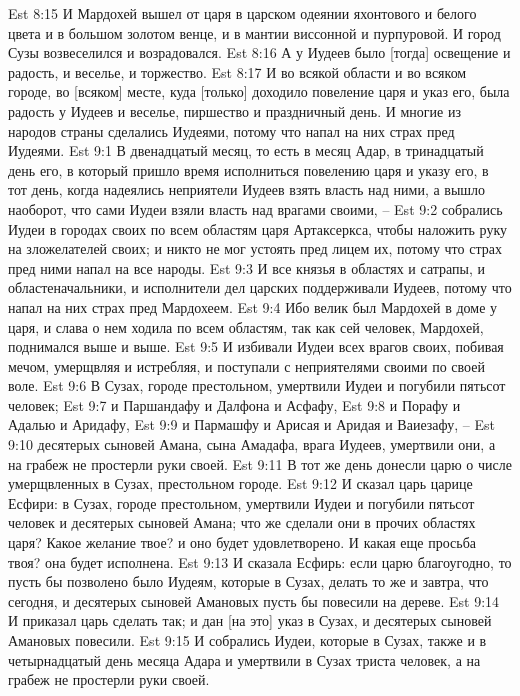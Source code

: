 Est 8:15  И Мардохей вышел от царя в царском одеянии яхонтового и белого цвета и в большом золотом венце, и в мантии виссонной и пурпуровой. И город Сузы возвеселился и возрадовался.
Est 8:16  А у Иудеев было [тогда] освещение и радость, и веселье, и торжество.
Est 8:17  И во всякой области и во всяком городе, во [всяком] месте, куда [только] доходило повеление царя и указ его, была радость у Иудеев и веселье, пиршество и праздничный день. И многие из народов страны сделались Иудеями, потому что напал на них страх пред Иудеями.
Est 9:1  В двенадцатый месяц, то есть в месяц Адар, в тринадцатый день его, в который пришло время исполниться повелению царя и указу его, в тот день, когда надеялись неприятели Иудеев взять власть над ними, а вышло наоборот, что сами Иудеи взяли власть над врагами своими, --
Est 9:2  собрались Иудеи в городах своих по всем областям царя Артаксеркса, чтобы наложить руку на зложелателей своих; и никто не мог устоять пред лицем их, потому что страх пред ними напал на все народы.
Est 9:3  И все князья в областях и сатрапы, и областеначальники, и исполнители дел царских поддерживали Иудеев, потому что напал на них страх пред Мардохеем.
Est 9:4  Ибо велик был Мардохей в доме у царя, и слава о нем ходила по всем областям, так как сей человек, Мардохей, поднимался выше и выше.
Est 9:5  И избивали Иудеи всех врагов своих, побивая мечом, умерщвляя и истребляя, и поступали с неприятелями своими по своей воле.
Est 9:6  В Сузах, городе престольном, умертвили Иудеи и погубили пятьсот человек;
Est 9:7  и Паршандафу и Далфона и Асфафу,
Est 9:8  и Порафу и Адалью и Аридафу,
Est 9:9  и Пармашфу и Арисая и Аридая и Ваиезафу, --
Est 9:10  десятерых сыновей Амана, сына Амадафа, врага Иудеев, умертвили они, а на грабеж не простерли руки своей.
Est 9:11  В тот же день донесли царю о числе умерщвленных в Сузах, престольном городе.
Est 9:12  И сказал царь царице Есфири: в Сузах, городе престольном, умертвили Иудеи и погубили пятьсот человек и десятерых сыновей Амана; что же сделали они в прочих областях царя? Какое желание твое? и оно будет удовлетворено. И какая еще просьба твоя? она будет исполнена.
Est 9:13  И сказала Есфирь: если царю благоугодно, то пусть бы позволено было Иудеям, которые в Сузах, делать то же и завтра, что сегодня, и десятерых сыновей Амановых пусть бы повесили на дереве.
Est 9:14  И приказал царь сделать так; и дан [на это] указ в Сузах, и десятерых сыновей Амановых повесили.
Est 9:15  И собрались Иудеи, которые в Сузах, также и в четырнадцатый день месяца Адара и умертвили в Сузах триста человек, а на грабеж не простерли руки своей.
